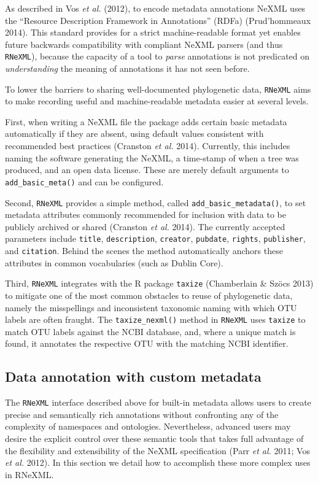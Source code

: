 \documentclass[author-year, review, 11pt]{components/elsarticle} %
\begin{document}
As described in Vos \emph{et al.} (2012), to encode metadata annotations
NeXML uses the ``Resource Description Framework in Annotations'' (RDFa)
(Prud'hommeaux 2014). This standard provides for a strict
machine-readable format yet enables future backwards compatibility with
compliant NeXML parsers (and thus \texttt{RNeXML}), because the capacity
of a tool to \emph{parse} annotations is not predicated on
\emph{understanding} the meaning of annotations it has not seen before.

To lower the barriers to sharing well-documented phylogenetic data,
\texttt{RNeXML} aims to make recording useful and machine-readable
metadata easier at several levels.

First, when writing a NeXML file the package adds certain basic metadata
automatically if they are absent, using default values consistent with
recommended best practices (Cranston \emph{et al.} 2014). Currently,
this includes naming the software generating the NeXML, a time-stamp of
when a tree was produced, and an open data license. These are merely
default arguments to \texttt{add\_basic\_meta()} and can be configured.

Second, \texttt{RNeXML} provides a simple method, called
\texttt{add\_basic\_metadata()}, to set metadata attributes commonly
recommended for inclusion with data to be publicly archived or shared
(Cranston \emph{et al.} 2014). The currently accepted parameters include
\texttt{title}, \texttt{description}, \texttt{creator},
\texttt{pubdate}, \texttt{rights}, \texttt{publisher}, and
\texttt{citation}. Behind the scenes the method automatically anchors
these attributes in common vocabularies (such as Dublin Core).

Third, \texttt{RNeXML} integrates with the R package \texttt{taxize}
(Chamberlain \& Szöcs 2013) to mitigate one of the most common obstacles
to reuse of phylogenetic data, namely the misspellings and inconsistent
taxonomic naming with which OTU labels are often fraught. The
\texttt{taxize\_nexml()} method in \texttt{RNeXML} uses \texttt{taxize}
to match OTU labels against the NCBI database, and, where a unique match
is found, it annotates the respective OTU with the matching NCBI
identifier.

\subsection{Data annotation with custom
metadata}\label{data-annotation-with-custom-metadata}

The \texttt{RNeXML} interface described above for built-in metadata
allows users to create precise and semantically rich annotations without
confronting any of the complexity of namespaces and ontologies.
Nevertheless, advanced users may desire the explicit control over these
semantic tools that takes full advantage of the flexibility and
extensibility of the NeXML specification (Parr \emph{et al.} 2011; Vos
\emph{et al.} 2012). In this section we detail how to accomplish these
more complex uses in RNeXML.
\end{document}

